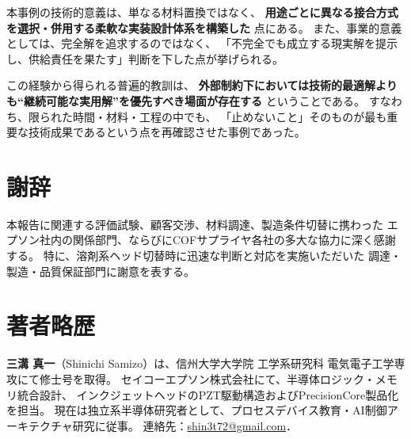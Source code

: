 \documentclass[conference]{IEEEtran}
\begin{document}
本事例の技術的意義は、単なる材料置換ではなく、  
\textbf{用途ごとに異なる接合方式を選択・併用する柔軟な実装設計体系を構築した}  
点にある。  
また、事業的意義としては、完全解を追求するのではなく、  
「不完全でも成立する現実解を提示し、供給責任を果たす」判断を下した点が挙げられる。  

この経験から得られる普遍的教訓は、  
\textbf{外部制約下においては技術的最適解よりも“継続可能な実用解”を優先すべき場面が存在する}  
ということである。  
すなわち、限られた時間・材料・工程の中でも、  
「止めないこと」そのものが最も重要な技術成果であるという点を再確認させた事例であった。

\section*{謝辞}

本報告に関連する評価試験、顧客交渉、材料調達、製造条件切替に携わった  
エプソン社内の関係部門、ならびにCOFサプライヤ各社の多大な協力に深く感謝する。  
特に、溶剤系ヘッド切替時に迅速な判断と対応を実施いただいた  
調達・製造・品質保証部門に謝意を表する。

\section*{著者略歴}

\textbf{三溝 真一}（Shinichi Samizo）は、信州大学大学院 工学系研究科 電気電子工学専攻にて修士号を取得。  
セイコーエプソン株式会社にて、半導体ロジック・メモリ統合設計、  
インクジェットヘッドのPZT駆動構造およびPrecisionCore製品化を担当。  
現在は独立系半導体研究者として、プロセスデバイス教育・AI制御アーキテクチャ研究に従事。  
連絡先：\href{mailto:shin3t72@gmail.com}{shin3t72@gmail.com}．

\balance %
\end{document}
